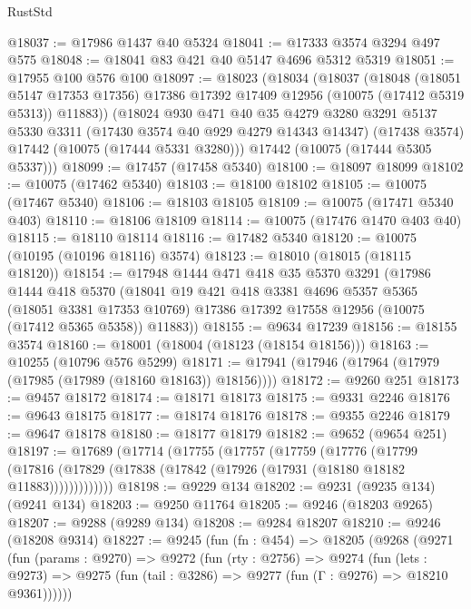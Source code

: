 \begin{lexlean}{RustStd}
\begin{coremodule}
{\begin{coremodule}
{{{{{{{{{{{{{{{{{{{{{{{{{{{{{{{{{@18037 := @17986 @1437 @40 @5324
@18041 := @17333 @3574 @3294 @497 @575
@18048 := @18041 @83 @421 @40 @5147 @4696 @5312 @5319
@18051 := @17955 @100 @576 @100
@18097 := @18023
    (@18034
      (@18037
        (@18048
          (@18051 @5147 @17353 @17356)
          @17386
          @17392
          @17409
          @12956
          (@10075 (@17412 @5319 @5313))
          @11883))
      (@18024
        @930
        @471
        @40
        @35
        @4279
        @3280
        @3291
        @5137
        @5330
        @3311
        (@17430 @3574 @40 @929 @4279 @14343 @14347)
        (@17438 @3574)
        @17442
        (@10075 (@17444 @5331 @3280)))
      @17442
      (@10075 (@17444 @5305 @5337)))
@18099 := @17457 (@17458 @5340)
@18100 := @18097 @18099
@18102 := @10075 (@17462 @5340)
@18103 := @18100 @18102
@18105 := @10075 (@17467 @5340)
@18106 := @18103 @18105
@18109 := @10075 (@17471 @5340 @403)
@18110 := @18106 @18109
@18114 := @10075 (@17476 @1470 @403 @40)
@18115 := @18110 @18114
@18116 := @17482 @5340
@18120 := @10075 (@10195 (@10196 @18116) @3574)
@18123 := @18010 (@18015 (@18115 @18120))
@18154 := @17948
    @1444
    @471
    @418
    @35
    @5370
    @3291
    (@17986
      @1444
      @418
      @5370
      (@18041
        @19
        @421
        @418
        @3381
        @4696
        @5357
        @5365
        (@18051 @3381 @17353 @10769)
        @17386
        @17392
        @17558
        @12956
        (@10075 (@17412 @5365 @5358))
        @11883))
@18155 := @9634 @17239
@18156 := @18155 @3574
@18160 := @18001 (@18004 (@18123 (@18154 @18156)))
@18163 := @10255 (@10796 @576 @5299)
@18171 := @17941 (@17946 (@17964 (@17979 (@17985 (@17989 (@18160 @18163)) @18156))))
@18172 := @9260 @251
@18173 := @9457 @18172
@18174 := @18171 @18173
@18175 := @9331 @2246
@18176 := @9643 @18175
@18177 := @18174 @18176
@18178 := @9355 @2246
@18179 := @9647 @18178
@18180 := @18177 @18179
@18182 := @9652 (@9654 @251)
@18197 := @17689
    (@17714
      (@17755
        (@17757
          (@17759
            (@17776
              (@17799
                (@17816 (@17829 (@17838 (@17842 (@17926 (@17931 (@18180 @18182 @11883)))))))))))))
@18198 := @9229 @134
@18202 := @9231 (@9235 @134) (@9241 @134)
@18203 := @9250 @11764
@18205 := @9246 (@18203 @9265)
@18207 := @9288 (@9289 @134)
@18208 := @9284 @18207
@18210 := @9246 (@18208 @9314)
@18227 := @9245
    (fun (fn : @454) =>
    @18205
      (@9268
        (@9271
          (fun (params : @9270) =>
          @9272
            (fun (rty : @2756) =>
            @9274
              (fun (lets : @9273) =>
              @9275 (fun (tail : @3286) => @9277 (fun (Γ : @9276) => @18210 @9361))))))
}}}}}}}}}}}}}}}}}}}}}}}}}}}}}}}}}
\end{coremodule}}
\end{coremodule}
\end{lexlean}
